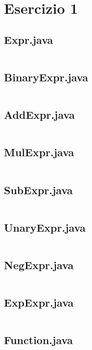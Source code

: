 \section*{Esercizio 1}

\subsection*{Expr.java}
\inputminted{java}{tex/src/1/Expr.java}

\subsection*{BinaryExpr.java}
\inputminted{java}{tex/src/1/BinaryExpr.java}

\subsection*{AddExpr.java}
\inputminted{java}{tex/src/1/AddExpr.java}

\subsection*{MulExpr.java}
\inputminted{java}{tex/src/1/MulExpr.java}

\subsection*{SubExpr.java}
\inputminted{java}{tex/src/1/SubExpr.java}

\subsection*{UnaryExpr.java}
\inputminted{java}{tex/src/1/UnaryExpr.java}

\subsection*{NegExpr.java}
\inputminted{java}{tex/src/1/NegExpr.java}

\subsection*{ExpExpr.java}
\inputminted{java}{tex/src/1/ExpExpr.java}

\subsection*{Function.java}
\inputminted{java}{tex/src/1/Function.java}
